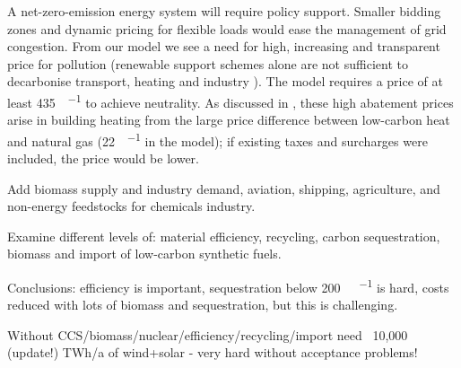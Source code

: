 A net-zero-emission energy system will require policy support.
Smaller bidding zones and dynamic pricing for flexible loads would
ease the management of grid congestion. From our model we see a need
for high, increasing and transparent price for \co pollution
(renewable support schemes alone are not sufficient to decarbonise
transport, heating and industry \cite{zhuImpactCO22018}). The model requires
a \co price of at least \SI{435}{\sieuro\per\tco} to achieve \co
neutrality. As discussed in \cite{brownSynergiesSector2018}, these high abatement
prices arise in building heating from the large price difference
between low-carbon heat and natural gas (\SI{22}{\sieuro\per\mwh} in the model);
if existing taxes and surcharges were included, the \co price would
be lower.



Add biomass supply and industry demand, aviation, shipping, agriculture, and non-energy
feedstocks for chemicals industry.

Examine different levels of: material efficiency, recycling, carbon
sequestration, biomass and import of low-carbon synthetic fuels.

Conclusions: efficiency is important, sequestration below \SI{200}{\mega\tco\per\year} is hard,
costs reduced with lots of biomass and sequestration, but this is challenging.

Without CCS/biomass/nuclear/efficiency/recycling/import need ~10,000 (update!) TWh/a of
wind+solar - very hard without acceptance problems!